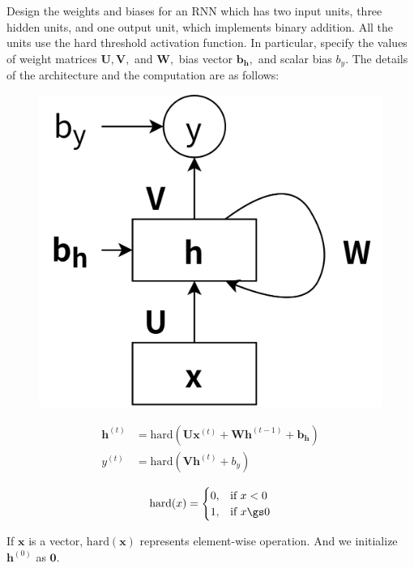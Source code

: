 \documentclass[openany]{ctexbook}
\theoremstyle{kaiti}
\theoremstyle{normal}
\begin{document}
Design the weights and biases for an RNN which has two input units, three hidden units, and one output unit, which implements binary addition. All the units use the hard threshold activation function. In particular, specify the values of weight matrices \(\bm{U}, \bm{V},\) and \(\bm{W},\) bias vector \(\bm{b}_{\bm{h}},\) and scalar bias \(b_{y}\). The details of the architecture and the computation are as follows:
\begin{figure}[!ht]
   \centering
   \includegraphics[scale=0.5]{fig2.png}
   \label{fig:1_2}
\end{figure}
\begin{equation}
  \begin{aligned}
    \bm{h}^{(t)} &= \mathrm{hard}(\bm{U}\bm{x}^{(t)} + \bm{W}\bm{h}^{(t-1)} + \bm{b}_{\bm{h}}) \\
    y^{(t)} &= \mathrm{hard}(\bm{V}\bm{h}^{(t)} + b_{y}) \\
  \end{aligned}
\end{equation}
\begin{equation}
  \mathrm{hard}(x)=
  \begin{cases}
    0, &\text{if}~x<0 \\
    1, &\text{if}~x\gs0 \\
  \end{cases}
\end{equation}

If $\bm{x}$ is a vector, $\mathrm{hard}(\bm{x})$ represents element-wise operation. And we initialize $\bm{h}^{(0)}$ as $\bm{0}$.
\end{document}
